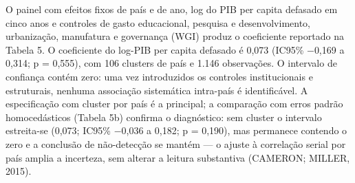 \documentclass[12pt,a4paper]{article}
\begin{document}
O painel com efeitos fixos de país e de ano, log do PIB per capita defasado em cinco anos e controles de gasto educacional, pesquisa e desenvolvimento, urbanização, manufatura e governança (WGI) produz o coeficiente reportado na Tabela 5. O coeficiente do log-PIB per capita defasado é 0,073 (IC95\% $-$0,169 a 0,314; p = 0,555), com 106 clusters de país e 1.146 observações. O intervalo de confiança contém zero: uma vez introduzidos os controles institucionais e estruturais, nenhuma associação sistemática intra-país é identificável. A especificação com cluster por país é a principal; a comparação com erros padrão homocedásticos (Tabela 5b) confirma o diagnóstico: sem cluster o intervalo estreita-se (0,073; IC95\% $-$0,036 a 0,182; p = 0,190), mas permanece contendo o zero e a conclusão de não-detecção se mantém --- o ajuste à correlação serial por país amplia a incerteza, sem alterar a leitura substantiva (CAMERON; MILLER, 2015).

\begin{table}[htbp]
\centering
\caption{Painel com efeitos fixos de país e ano, controles e erros clusterizados por país}
\label{tab:painel}
\small
{}
\par{}
\end{table}

\begin{table}[htbp]
\centering
\caption{Painel com efeitos fixos: erros padrão clusterizados e homocedásticos (comparação)}
\label{tab:clustercomp}
\small
{}
\par{}
\end{table}
\end{document}
